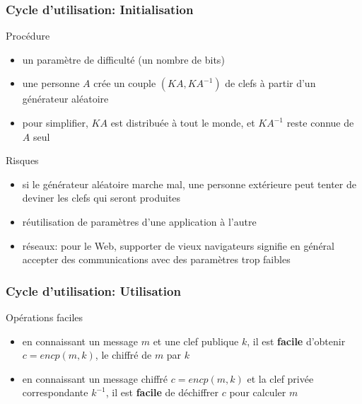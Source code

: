 \begin{reveals}
\begin{frame}
  \vfill


\end{frame}


\begin{frame}
  \frametitle{Cycle d'utilisation: Initialisation}

  \vfill

  \begin{block}{Procédure}
    \begin{itemize}
    \item un paramètre de difficulté (un nombre de bits)
    \item une personne \(A\) crée un couple \((KA,KA^{-1})\) de clefs
      à partir d'un générateur aléatoire
    \item pour simplifier, \(KA\) est distribuée à tout le monde, et
      \(KA^{-1}\) reste connue de \(A\) seul
    \end{itemize}
  \end{block}

  \vfill

  \begin{block}{Risques}
    \begin{itemize}
    \item si le générateur aléatoire marche mal, une personne
      extérieure peut tenter de deviner les clefs qui seront produites
    \item réutilisation de paramètres d'une application à l'autre
    \item réseaux: pour le Web, supporter de vieux navigateurs
      signifie en général accepter des communications avec des
      paramètres trop faibles
    \end{itemize}
  \end{block}

  \vfill

\end{frame}


\begin{frame}
  \frametitle{Cycle d'utilisation: Utilisation}

  \vfill

  \begin{block}{Opérations faciles}
    \begin{itemize}
    \item en connaissant un message \(m\) et une clef publique \(k\),
      il est \textbf{facile} d'obtenir \(c=encp(m,k)\), le chiffré de
      \(m\) par \(k\)
    \item en connaissant un message chiffré \(c=encp(m,k)\) et la clef
      privée correspondante \(k^{-1}\), il est \textbf{facile} de déchiffrer
      \(c\) pour calculer \(m\)
    \end{itemize}
  \end{block}


\end{frame}
\end{reveals}
